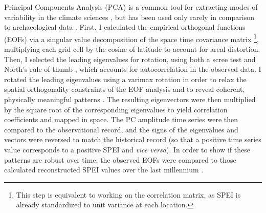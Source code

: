 \documentclass[10pt]{iopart}
\begin{document}
Principal Components Analysis (PCA) is a common tool for extracting modes of variability in the climate sciences \parencite{lorenz,Hannachi2007}, but has been used only rarely in comparison to archaeological data \parencite{Weiss1982, Cordell2007}. First, I calculated the empirical orthogonal functions (EOFs) via a singular value decomposition of the space time covariance matrix \footnote{This step is equivalent to working on the correlation matrix, as SPEI is already standardized to unit variance at each location.}, multiplying each grid cell by the cosine of latitude to account for areal distortion. Then, I selected the leading eigenvalues for rotation, using both a scree test and North's rule of thumb \parencite{North1982}, which accounts for autocorrelation in the observed data. I rotated the leading eigenvalues using a varimax rotation in order to relax the spatial orthogonality constraints of the EOF analysis and to reveal coherent, physically meaningful patterns \parencite{Richman1986}. The resulting eigenvectors were then multiplied by the square root of the corresponding eigenvalues to yield correlation coefficients and mapped in space. The PC amplitude time series were then compared to the observational record, and the signs of the eigenvalues and vectors were reversed to match the historical record (so that a positive time series value corresponds to a positive SPEI and \textit{vice versa}). In order to show if these patterns are robust over time, the observed EOFs were compared to those calculated reconstructed SPEI values over the last millennium \parencite{Steiger2018}.
\end{document}
